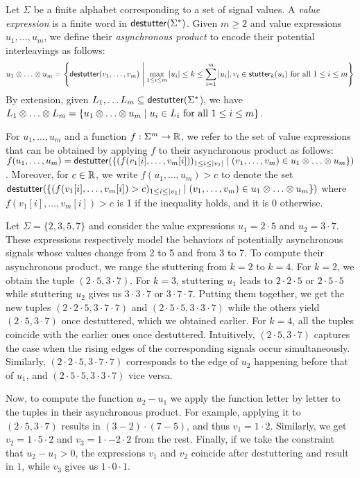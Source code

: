 Let $\Sigma$ be a finite alphabet corresponding to a set of signal values.
A \emph{value expression} is a finite word in $\mathsf{destutter}(\Sigma^*)$.
Given $m \geq 2$ and value expressions $u_1, \ldots, u_m$, we define their \emph{asynchronous product} to encode their potential interleavings as follows:
\small
$$u_1 \otimes \ldots \otimes u_m = \left\lbrace  \destutter(v_1, \ldots, v_m) \st \max_{1 \leq i \leq m} |u_i| \leq k \leq \sum_{i = 1}^{m} |u_i|, v_i \in \stutter_k(u_i) \text{ for all } 1 \leq i \leq m \right\rbrace$$  
\normalsize
By extension, given $L_1, \ldots L_m \subseteq \mathsf{destutter}(\Sigma^*$), we have $L_1 \otimes \ldots \otimes L_m = \{ u_1 \otimes \ldots \otimes u_m \st u_i \in L_i \text{ for all } 1 \leq i \leq m\}$.

For $u_1, \ldots, u_m$ and a function $f : \Sigma^m \to \mathbb{R}$, we refer to the set of value expressions that can be obtained by applying $f$ to their asynchronous product as follows: $f(u_1, \ldots, u_m) = \destutter(\{(f(v_1[i], \ldots, v_m[i]))_{1 \leq i \leq |v_1|} \st (v_1, \ldots, v_m) \in u_1 \otimes \ldots \otimes u_m\})$.
Moreover, for $c \in \mathbb{R}$, we write $f(u_1, \ldots, u_m) > c$ to denote the set $\destutter(\{(f(v_1[i], \ldots, v_m[i]) > c)_{1 \leq i \leq |v_1|} \st (v_1, \ldots, v_m) \in u_1 \otimes \ldots \otimes u_m\})$ where $f(v_1[i], \ldots, v_m[i]) > c$ is 1 if the inequality holds, and it is 0 otherwise.

\begin{example} \label{ex:valexpr}
	Let $\Sigma = \{2, 3, 5, 7\}$ and consider the value expressions $u_1 = 2 \cdot 5$ and $u_2 = 3 \cdot 7$.
	These expressions respectively model the behaviors of potentially asynchronous signals whose values change from 2 to 5 and from 3 to 7.
	To compute their asynchronous product, we range the stuttering from $k = 2$ to $k = 4$.
	For $k = 2$, we obtain the tuple $(2 \cdot 5, 3 \cdot 7)$.
	For $k = 3$, stuttering $u_1$ leads to $2 \cdot 2 \cdot 5$ or $2 \cdot 5 \cdot 5$ while stuttering $u_2$ gives us $3 \cdot 3 \cdot 7$ or $3 \cdot 7 \cdot 7$.
	Putting them together, we get the new tuples $(2 \cdot 2 \cdot 5, 3 \cdot 7 \cdot 7)$ and $(2 \cdot 5 \cdot 5, 3 \cdot 3 \cdot 7)$ while the others yield $(2 \cdot 5, 3 \cdot 7)$ once destuttered, which we obtained earlier.
	For $k = 4$, all the tuples coincide with the earlier ones once destuttered.
	Intuitively, $(2 \cdot 5, 3 \cdot 7)$ captures the case when the rising edges of the corresponding signals occur simultaneously.
	Similarly, $(2 \cdot 2 \cdot 5, 3 \cdot 7 \cdot 7)$ corresponds to the edge of $u_2$ happening before that of $u_1$, and $(2 \cdot 5 \cdot 5, 3 \cdot 3 \cdot 7)$ vice versa.
	
	Now, to compute the function $u_2 - u_1$ we apply the function letter by letter to the tuples in their asynchronous product.
	For example, applying it to $(2 \cdot 5, 3 \cdot 7)$ results in $(3 - 2) \cdot (7 - 5)$, and thus $v_1 = 1 \cdot 2$.
	Similarly, we get $v_2 = 1 \cdot 5 \cdot 2$ and $v_3 = 1 \cdot -2 \cdot 2$ from the rest.
	Finally, if we take the constraint that $u_2 - u_1  > 0$, the expressions $v_1$ and $v_2$ coincide after destuttering and result in $1$, while $v_3$ gives us $1 \cdot 0 \cdot 1$.
\end{example}

